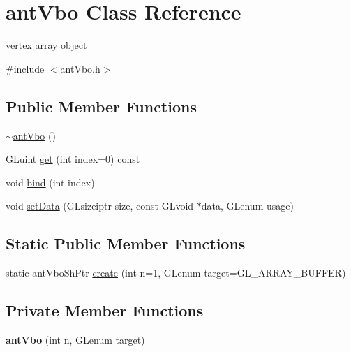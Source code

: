 \hypertarget{classant_vbo}{\section{ant\+Vbo Class Reference}
\label{classant_vbo}
}


vertex array object  




{\ttfamily \#include $<$ant\+Vbo.\+h$>$}

\subsection*{Public Member Functions}
\begin{DoxyCompactItemize}
\item 
\hyperlink{classant_vbo_abf307882f88ca5d1215c9e281e9e36de}{$\sim$ant\+Vbo} ()
\item 
G\+Luint \hyperlink{classant_vbo_afecdb59e8844479186c1d4f0753252df}{get} (int index=0) const 
\item 
void \hyperlink{classant_vbo_a6348372fe04cc909b526cc40166e1544}{bind} (int index)
\item 
void \hyperlink{classant_vbo_aef854ede5ec02a59bfa1bea378e36e49}{set\+Data} (G\+Lsizeiptr size, const G\+Lvoid $\ast$data, G\+Lenum usage)
\end{DoxyCompactItemize}
\subsection*{Static Public Member Functions}
\begin{DoxyCompactItemize}
\item 
static ant\+Vbo\+Sh\+Ptr \hyperlink{classant_vbo_a2bae5b06d160917e4db3761e738f8d96}{create} (int n=1, G\+Lenum target=G\+L\+\_\+\+A\+R\+R\+A\+Y\+\_\+\+B\+U\+F\+F\+E\+R)
\end{DoxyCompactItemize}
\subsection*{Private Member Functions}
\begin{DoxyCompactItemize}
\item 
\hypertarget{classant_vbo_a18c59e211890a63677ab263ee8cf2888}{{\bfseries ant\+Vbo} (int n, G\+Lenum target)}\label{classant_vbo_a18c59e211890a63677ab263ee8cf2888}

\end{DoxyCompactItemize}
